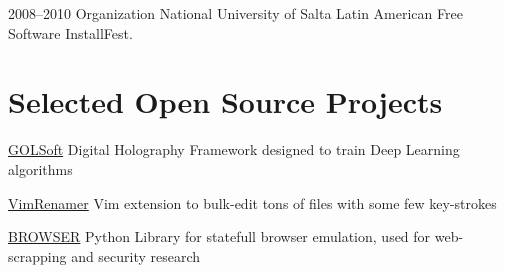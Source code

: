 \documentclass[11pt,a4paper]{moderncv}
\begin{document}
        \cventry                                                                                                  %
            {2008--2010}                                                                                          %
            {Organization}                                                                                        %
            {National University of Salta}                                                                        %
            {}                                                                                                    %
            {Latin American Free Software InstallFest.}                                                           %
            {}                                                                                                    %

\section{Selected Open Source Projects}


    \cventry{}
        {\href{https://github.com/pointtonull/golsoft}{GOLSoft}}
        {Digital Holography Framework designed
         to train Deep Learning algorithms}
        {}{}{}

    \cventry{}
        {\href{https://github.com/pointtonull/vimrenamer}{VimRenamer}}
        {Vim extension to bulk-edit tons of files with some few key-strokes}
        {}{}{}

    \cventry{}
        {\href{https://github.com/pointtonull/browser}{BROWSER}}
        {Python Library for statefull browser emulation,
         used for web-scrapping and security research}
        {}{}{}

\end{document}
